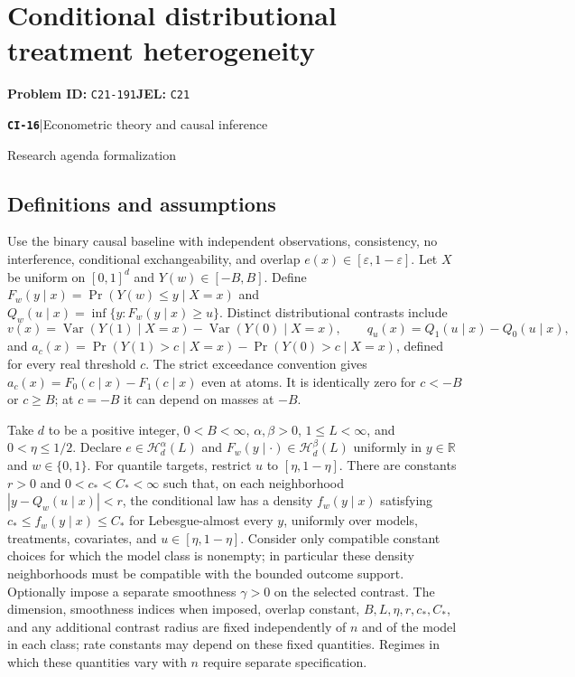 \documentclass[11pt,a4paper]{article}
\newcommand{\R}{\mathbb R}
\newcommand{\entrymeta}[3]{{\sffamily\small\color{muted}\textbf{\texttt{#1}}\quad|\quad #2\par #3\par}}
\begin{document}
\section*{Conditional distributional treatment heterogeneity}
\textbf{Problem ID:} \texttt{C21-191}\quad \textbf{JEL:} \texttt{C21}\par
\label{problem:OP-0495}
\label{beyond:CI-16}
\entrymeta{CI-16}{Econometric theory and causal inference}{Research agenda formalization}
\subsection*{Definitions and assumptions}
Use the binary causal baseline with independent observations, consistency, no interference, conditional exchangeability, and overlap $e(x)\in[\varepsilon,1-\varepsilon]$. Let $X$ be uniform on $[0,1]^d$ and $Y(w)\in[-B,B]$. Define $F_w(y\mid x)=\Pr(Y(w)\leq y\mid X=x)$ and $Q_w(u\mid x)=\inf\{y:F_w(y\mid x)\geq u\}$. Distinct distributional contrasts include
\[
v(x)=\operatorname{Var}(Y(1)\mid X=x)-
      \operatorname{Var}(Y(0)\mid X=x),\qquad
q_u(x)=Q_1(u\mid x)-Q_0(u\mid x),
\]
and $a_c(x)=\Pr(Y(1)>c\mid X=x)-\Pr(Y(0)>c\mid X=x)$, defined for every real threshold $c$. The strict exceedance convention gives $a_c(x)=F_0(c\mid x)-F_1(c\mid x)$ even at atoms. It is identically zero for $c<-B$ or $c\geq B$; at $c=-B$ it can depend on masses at $-B$.

Take $d$ to be a positive integer, $0<B<\infty$, $\alpha,\beta>0$, $1\leq L<\infty$, and $0<\eta\leq1/2$. Declare $e\in\mathcal H_d^\alpha(L)$ and $F_w(y\mid\cdot)\in\mathcal H_d^\beta(L)$ uniformly in $y\in\R$ and $w\in\{0,1\}$. For quantile targets, restrict $u$ to $[\eta,1-\eta]$. There are constants $r>0$ and $0<c_*<C_*<\infty$ such that, on each neighborhood $|y-Q_w(u\mid x)|<r$, the conditional law has a density $f_w(y\mid x)$ satisfying $c_*\leq f_w(y\mid x)\leq C_*$ for Lebesgue-almost every $y$, uniformly over models, treatments, covariates, and $u\in[\eta,1-\eta]$. Consider only compatible constant choices for which the model class is nonempty; in particular these density neighborhoods must be compatible with the bounded outcome support. Optionally impose a separate smoothness $\gamma>0$ on the selected contrast. The dimension, smoothness indices when imposed, overlap constant, $B,L,\eta,r,c_*,C_*$, and any additional contrast radius are fixed independently of $n$ and of the model in each class; rate constants may depend on these fixed quantities. Regimes in which these quantities vary with $n$ require separate specification.
\end{document}
